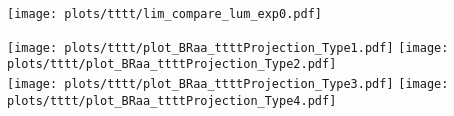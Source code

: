 \begin{figure*}[hbpt]
\centering
        \texttt{[image: plots/tttt/lim\_compare\_lum\_exp0.pdf]}
    \caption{Projected expected limits on $(\sigma(h)/\sigma_{\textrm{SM}}) \mathcal{B}(h \to aa \to 4\tau)$, comparing different scenarios for systematic uncertainties for an integrated luminosity of 3000 fb$^{-1}$.}
    \label{fig:tttt_proj}
\end{figure*}

\begin{figure*}[hbpt]
\centering
        \texttt{[image: plots/tttt/plot\_BRaa\_ttttProjection\_Type1.pdf]}
        \texttt{[image: plots/tttt/plot\_BRaa\_ttttProjection\_Type2.pdf]} \\
        \texttt{[image: plots/tttt/plot\_BRaa\_ttttProjection\_Type3.pdf]}
        \texttt{[image: plots/tttt/plot\_BRaa\_ttttProjection\_Type4.pdf]}
    \caption{Expected upper limits on $(\sigma(h)/\sigma_{\textrm{SM}})\mathcal{B}( h \to aa)$ for 3000\fbinv of data with YR18 systematic uncertainties for the $4\tau$ final state in 2HDM+S type-1 (top left), type-2 (top right), type-3 (bottom left), and type-4 (bottom right).}
    \label{fig:summary_tttt}
\end{figure*}
